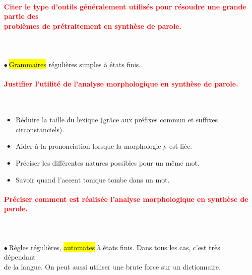 \documentclass[letterpaper, 12pt]{article}
\newcommand{\alinea}{
\hspace*{0.3cm}}
\newcommand{\red}[1]{
	\textcolor{red}{#1}
}
\newcommand{\point}{$\bullet\ $}
\begin{document}
		\paragraph{\red{Citer le type d'outils généralement utilisés pour résoudre une grande partie des 
		~\\ \hspace*{0.035cm} problèmes de prétraitement en synthèse de parole.}}~\\~\\
			\point \hl{Grammaires} régulières simples à états finis.
		\vspace*{-0.75cm}
		\paragraph{\red{Justifier l'utilité de l'analyse morphologique en synthèse de parole.}}~\\
			 \begin{itemize}
			 	\setlength{\itemsep}{0pt}		
			 	\setlength{\parskip}{0pt}		
			 	\setlength{\parsep}{0pt}	
			 	\item Réduire la taille du lexique (grâce aux préfixes commun et suffixes circonstanciels).
			 	\item Aider à la prononciation lorsque la morphologie y est liée.
			 	\item Préciser les différentes natures possibles pour un même mot.
			 	\item Savoir quand l'accent tonique tombe dans un mot.
			 \end{itemize}
		\paragraph{\red{Préciser comment est réalisée l'analyse morphologique en synthèse de parole.}}~\\~\\
			\point Règles régulières, \hl{automates} à états finis. Dans tous les cas, c'est très dépendant 
				\\\alinea de la langue. On peut aussi utiliser une brute force sur un dictionnaire.
\end{document}
